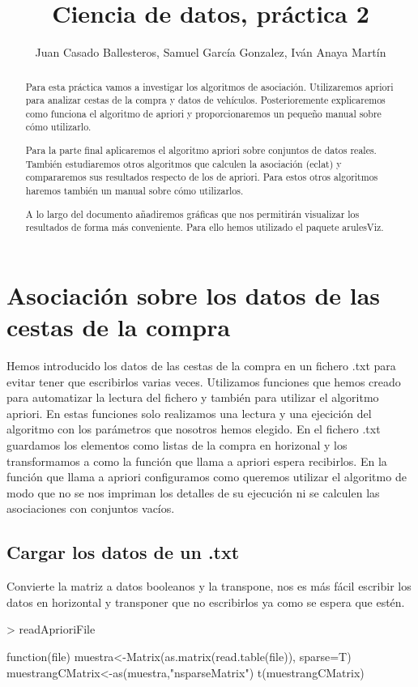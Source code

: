 \documentclass [a4paper] {article}
\title{Ciencia de datos, práctica 2}
\author{Juan Casado Ballesteros, Samuel García Gonzalez, Iván Anaya Martín}
\begin{document}
\maketitle

\begin{abstract}
Para esta práctica vamos a investigar los algoritmos de asociación.
Utilizaremos apriori para analizar cestas de la compra y datos de vehículos.
Posterioremente explicaremos como funciona el algoritmo de apriori y proporcionaremos un pequeño manual sobre cómo utilizarlo.

Para la parte final aplicaremos el algoritmo apriori sobre conjuntos de datos reales.
También estudiaremos otros algoritmos que calculen la asociación (eclat) y compararemos sus resultados respecto de los de apriori.
Para estos otros algoritmos haremos también un manual sobre cómo utilizarlos.

A lo largo del documento añadiremos gráficas que nos permitirán visualizar los resultados de forma más conveniente.
Para ello hemos utilizado el paquete arulesViz.
\end{abstract}

\newpage
\tableofcontents
\newpage


\section{Asociación sobre los datos de las cestas de la compra}
Hemos introducido los datos de las cestas de la compra en un fichero .txt para evitar tener que escribirlos varias veces.
Utilizamos funciones que hemos creado para automatizar la lectura del fichero y también para utilizar el algoritmo apriori.
En estas funciones solo realizamos una lectura y una ejecición del algoritmo con los parámetros que nosotros hemos elegido.
En el fichero .txt guardamos los elementos como listas de la compra en horizonal y los transformamos a como la función que llama a apriori espera recibirlos.
En la función que llama a apriori configuramos como queremos utilizar el algoritmo de modo que no se nos impriman los detalles de su ejecución
ni se calculen las asociaciones con conjuntos vacíos.

\subsection{Cargar los datos de un .txt}
Convierte la matriz a datos booleanos y la transpone, nos es más fácil escribir los datos en horizontal y transponer que no escribirlos ya como se espera que estén.
\begin{Schunk}
\begin{Sinput}
> readAprioriFile
\end{Sinput}
\begin{Soutput}
function(file){
  muestra<-Matrix(as.matrix(read.table(file)), sparse=T)
  muestrangCMatrix<-as(muestra,"nsparseMatrix")
  t(muestrangCMatrix)
}
\end{Soutput}
\end{Schunk}
\end{document}
